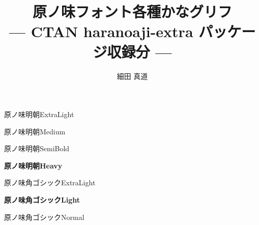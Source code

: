\documentclass[dvipdfmx]{jsarticle}
\title{原ノ味フォント各種かなグリフ \\
--- CTAN haranoaji-extra パッケージ収録分 ---}
\author{細田 真道}
\begin{document}
\maketitle

\clearpage
\parindent=0pt
\fboxsep=0pt

\mcfamily\ltseries
{\Large 原ノ味明朝\textmd{ExtraLight}}

\testAll

\clearpage

\mcfamily\mdseries
{\Large 原ノ味明朝\textmd{Medium}}

\testAll

\clearpage

\mgfamily %
{\Large 原ノ味明朝\textmd{SemiBold}}

\testAll

\clearpage

\mcfamily\bfseries
{\Large 原ノ味明朝\textmd{Heavy}}

\testAll

\clearpage

\gtfamily\mdseries
{\Large 原ノ味角ゴシック\textmd{ExtraLight}}

\testAll

\clearpage

\gtfamily\bfseries
{\Large 原ノ味角ゴシック\textmd{Light}}

\testAll

\clearpage

\gtfamily\ebseries
{\Large 原ノ味角ゴシック\textmd{Normal}}

\testAll
\end{document}
